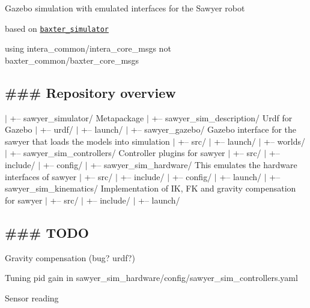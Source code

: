 Gazebo simulation with emulated interfaces for the Sawyer robot
\begin{DoxyItemize}
\item based on \href{https://github.com/RethinkRobotics/baxter_simulator}{\tt baxter\-\_\-simulator}
\item using {\ttfamily intera\-\_\-common/intera\-\_\-core\-\_\-msgs} not {\ttfamily baxter\-\_\-common/baxter\-\_\-core\-\_\-msgs}
\end{DoxyItemize}

\subsection*{\#\#\# Repository overview }

$\vert$ +-- sawyer\-\_\-simulator/ Metapackage $\vert$ +-- sawyer\-\_\-sim\-\_\-description/ Urdf for Gazebo $\vert$ +-- urdf/ $\vert$ +-- launch/ $\vert$ +-- sawyer\-\_\-gazebo/ Gazebo interface for the sawyer that loads the models into simulation $\vert$ +-- src/ $\vert$ +-- launch/ $\vert$ +-- worlds/ $\vert$ +-- sawyer\-\_\-sim\-\_\-controllers/ Controller plugins for sawyer $\vert$ +-- src/ $\vert$ +-- include/ $\vert$ +-- config/ $\vert$ +-- sawyer\-\_\-sim\-\_\-hardware/ This emulates the hardware interfaces of sawyer $\vert$ +-- src/ $\vert$ +-- include/ $\vert$ +-- config/ $\vert$ +-- launch/ $\vert$ +-- sawyer\-\_\-sim\-\_\-kinematics/ Implementation of I\-K, F\-K and gravity compensation for sawyer $\vert$ +-- src/ $\vert$ +-- include/ $\vert$ +-- launch/

\subsection*{\#\#\# T\-O\-D\-O }


\begin{DoxyItemize}
\item Gravity compensation (bug? urdf?)
\item Tuning pid gain in sawyer\-\_\-sim\-\_\-hardware/config/sawyer\-\_\-sim\-\_\-controllers.\-yaml
\item Sensor reading 
\end{DoxyItemize}
